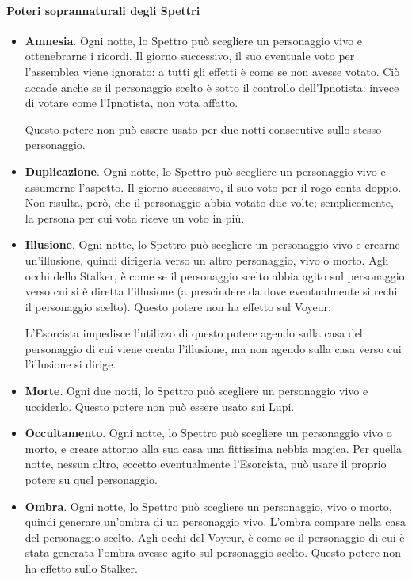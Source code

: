 \documentclass[a4paper,10pt]{article}
\begin{document}
\paragraph{Poteri soprannaturali degli Spettri}

\begin{itemize}
 \item {\bf Amnesia}. Ogni notte, lo Spettro può scegliere un personaggio vivo e ottenebrarne i ricordi. Il giorno successivo, il suo eventuale voto per l'assemblea viene ignorato: a tutti gli effetti è come se non avesse votato. Ciò accade anche se il personaggio scelto è sotto il controllo dell'Ipnotista: invece di votare come l'Ipnotista, non vota affatto.
 
 Questo potere non può essere usato per due notti consecutive sullo stesso personaggio.

 \item {\bf Duplicazione}. Ogni notte, lo Spettro può scegliere un personaggio vivo e assumerne l'aspetto. Il giorno successivo, il suo voto per il rogo conta doppio. Non risulta, però, che il personaggio abbia votato due volte; semplicemente, la persona per cui vota riceve un voto in più.

 \item {\bf Illusione}. Ogni notte, lo Spettro può scegliere un personaggio vivo e crearne un'illusione, quindi dirigerla verso un altro personaggio, vivo o morto.
 Agli occhi dello Stalker, è come se il personaggio scelto abbia agito sul personaggio verso cui si è diretta l'illusione (a prescindere da dove eventualmente si rechi il personaggio scelto).
 Questo potere non ha effetto sul Voyeur.
 
 L'Esorcista impedisce l'utilizzo di questo potere agendo sulla casa del personaggio di cui viene creata l'illusione, ma non agendo sulla casa verso cui l'illusione si dirige. 
 
 \item {\bf Morte}. Ogni due notti, lo Spettro può scegliere un personaggio vivo e ucciderlo. Questo potere non può essere usato sui Lupi.
 
 \item {\bf Occultamento}. Ogni notte, lo Spettro può scegliere un personaggio vivo o morto, e creare attorno alla sua casa una fittissima nebbia magica. Per quella notte, nessun altro, eccetto eventualmente l'Esorcista, può usare il proprio potere su quel personaggio.
 
 \item {\bf Ombra}. Ogni notte, lo Spettro può scegliere un personaggio, vivo o morto, quindi generare un'ombra di un personaggio vivo. L'ombra compare nella casa del personaggio scelto.
 Agli occhi del Voyeur, è come se il personaggio di cui è stata generata l'ombra avesse agito sul personaggio scelto.
 Questo potere non ha effetto sullo Stalker.
 

\end{itemize}
\end{document}
